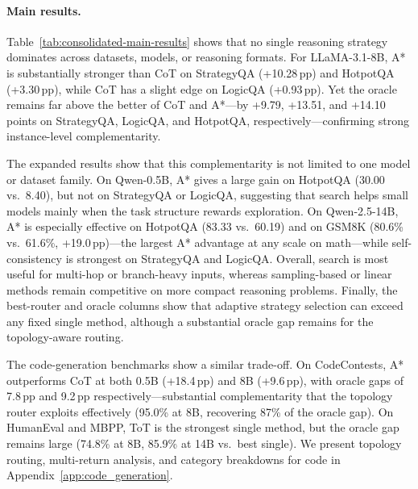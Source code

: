 \documentclass[11pt]{article}
\begin{document}
\paragraph{Main results.}
Table~\ref{tab:consolidated-main-results} shows that no single reasoning strategy dominates across datasets, models, or reasoning formats. For LLaMA-3.1-8B, A* is substantially stronger than CoT on StrategyQA (+10.28\,pp) and HotpotQA (+3.30\,pp), while CoT has a slight edge on LogicQA (+0.93\,pp). Yet the oracle remains far above the better of CoT and A*---by +9.79, +13.51, and +14.10 points on StrategyQA, LogicQA, and HotpotQA, respectively---confirming strong instance-level complementarity. 

The expanded results show that this complementarity is not limited to one model or dataset family. On Qwen-0.5B, A* gives a large gain on HotpotQA (30.00 vs.\ 8.40), but not on StrategyQA or LogicQA, suggesting that search helps small models mainly when the task structure rewards exploration. On Qwen-2.5-14B, A* is especially effective on HotpotQA (83.33 vs.\ 60.19) and on GSM8K (80.6\% vs.\ 61.6\%, +19.0\,pp)---the largest A* advantage at any scale on math---while self-consistency is strongest on StrategyQA and LogicQA. Overall, search is most useful for multi-hop or branch-heavy inputs, whereas sampling-based or linear methods remain competitive on more compact reasoning problems. Finally, the best-router and oracle columns show that adaptive strategy selection can exceed any fixed single method, although a substantial oracle gap remains for the topology-aware routing.

The code-generation benchmarks show a similar trade-off. On CodeContests, A* outperforms CoT at both 0.5B (+18.4\,pp) and 8B (+9.6\,pp), with oracle gaps of 7.8\,pp and 9.2\,pp respectively---substantial complementarity that the topology router exploits effectively (95.0\% at 8B, recovering 87\% of the oracle gap). On HumanEval and MBPP, ToT is the strongest single method, but the oracle gap remains large (74.8\% at 8B, 85.9\% at 14B vs.\ best single). We present topology routing, multi-return analysis, and category breakdowns for code in Appendix~\ref{app:code_generation}.

\end{document}
